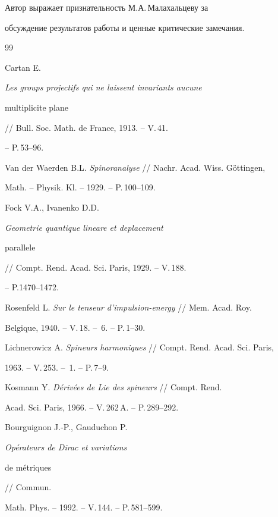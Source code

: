 Автор выражает признательность М.А.\,Малахальцеву за


обсуждение результатов работы и ценные критические замечания.








\begin{thebibliography}{99}







Cartan E. {\em Les groups projectifs qui ne laissent invariants aucune 


multiplicite plane} // Bull. Soc. Math. de France, 1913. -- V.\,41.


-- P.\,53--96.




Van der Waerden B.L. {\em Spinoranalyse} // Nachr. Acad. Wiss. G\"ottingen, 


Math. -- Physik. Kl. -- 1929. -- P.\,100--109.




Fock V.A., Ivanenko D.D. {\em Geometrie quantique lineare et deplacement 


parallele} // Compt. Rend. Acad. Sci. Paris, 1929. -- V.\,188.


-- P.\.1470--1472.




Rosenfeld L. {\em Sur le tenseur d'impulsion-energy} // Mem. Acad. Roy. 


Belgique, 1940. -- V.\,18. -- \No\,6. -- P.\,1--30.




Lichnerowicz A. {\em Spineurs harmoniques} // Compt. Rend. Acad. Sci. Paris,


1963. -- V.\,253. -- \No\,1. -- P.\,7--9.




Kosmann Y. {\em D\'eriv\'ees de Lie des spineurs} // Compt. Rend.


Acad. Sci. Paris, 1966. -- V.\,262\,A. -- P.\,289--292.




Bourguignon J.-P., Gauduchon P. {\em Op\'erateurs de Dirac et variations 


de m\'etriques} // Commun. 


Math. Phys. -- 1992. -- V.\,144. -- P.\,581--599.





\end{thebibliography}
